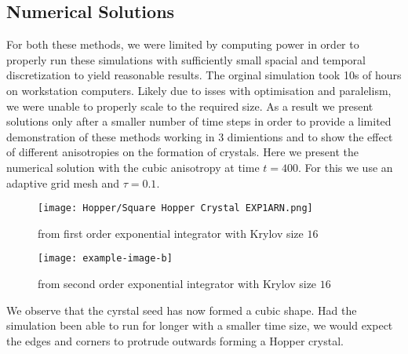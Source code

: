 \subsection{Numerical Solutions}
For both these methods, we were limited by computing power in order to properly run these simulations with sufficiently small spacial and temporal discretization to yield reasonable results.
The orginal simulation took 10s of hours on workstation computers.
Likely due to isses with optimisation and paralelism, we were unable to properly scale to the required size.
As a result we present solutions only after a smaller number of time steps in order to provide a limited demonstration of these methods working in 3 dimientions and to show the effect of different anisotropies on the formation of crystals.
Here we present the numerical solution with the cubic anisotropy at time $t=400$.
For this we use an adaptive grid mesh and $\tau = 0.1$.
\begin{figure}[H]
    \centering
    \begin{minipage}{0.49\textwidth}
        \texttt{[image: Hopper/Square Hopper Crystal EXP1ARN.png]} %
        \caption{from first order exponential integrator with Krylov size $16$}
        \label{fig:first order 8 0.5}
    \end{minipage}\hfill
    \centering
    \begin{minipage}{0.49\textwidth}
        \texttt{[image: example-image-b]} %
        \caption{from second order exponential integrator with Krylov size $16$}
        \label{fig:first order 10 0.5}
    \end{minipage}\hfill
\end{figure}
We observe that the cyrstal seed has now formed a cubic shape.
Had the simulation been able to run for longer with a smaller time size, we would expect the edges and corners to protrude outwards forming a Hopper crystal.


